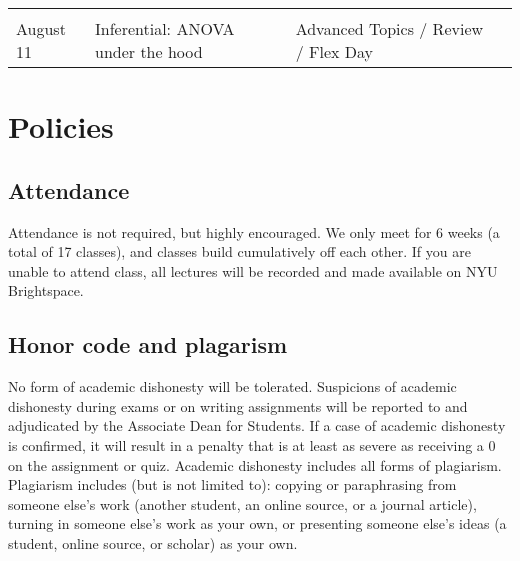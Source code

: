 \documentclass[
]{book}
\begin{document}
\begin{longtable}[]{@{}llll@{}}
\begin{minipage}[t]{0.18\columnwidth}
\strut
\end{minipage}\tabularnewline
\begin{minipage}[t]{0.09\columnwidth}\raggedright
August 11\strut
\end{minipage} & \begin{minipage}[t]{0.32\columnwidth}\raggedright
Inferential: ANOVA under the hood\strut
\end{minipage} & \begin{minipage}[t]{0.29\columnwidth}\raggedright
Advanced Topics / Review / Flex Day\strut
\end{minipage} & \begin{minipage}[t]{0.18\columnwidth}\raggedright
\strut
\end{minipage}\tabularnewline
\bottomrule
\end{longtable}

\hypertarget{policies}{%
\section{Policies}\label{policies}}

\hypertarget{attendance}{%
\subsection{Attendance}\label{attendance}}

Attendance is not required, but highly encouraged. We only meet for 6 weeks (a total of 17 classes), and classes build cumulatively off each other. If you are unable to attend class, all lectures will be recorded and made available on NYU Brightspace.

\hypertarget{honor-code-and-plagarism}{%
\subsection{Honor code and plagarism}\label{honor-code-and-plagarism}}

No form of academic dishonesty will be tolerated. Suspicions of academic dishonesty during exams or on writing assignments will be reported to and adjudicated by the Associate Dean for Students. If a case of academic dishonesty is confirmed, it will result in a penalty that is at least as severe as receiving a 0 on the assignment or quiz. Academic dishonesty includes all forms of plagiarism. Plagiarism includes (but is not limited to): copying or paraphrasing from someone else's work (another student, an online source, or a journal article), turning in someone else's work as your own, or presenting someone else's ideas (a student, online source, or scholar) as your own.
\end{document}
